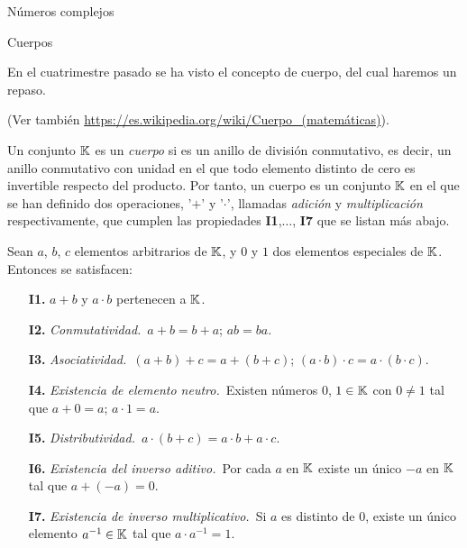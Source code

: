 \begin{chapter}{N\'umeros complejos}\label{chap-num-compl}

 \begin{section}{Cuerpos}\label{seccion-cuerpos}

  En el cuatrimestre pasado se ha visto el concepto de cuerpo, del cual haremos un repaso.

  (Ver también  \href{https://es.wikipedia.org/wiki/Cuerpo\_(matemáticas)}{https://es.wikipedia.org/wiki/Cuerpo\_(matemáticas)}).


  \begin{definicion}
      Un  conjunto $\mathbb K$ es un \textit{cuerpo} si es un anillo de división conmutativo, es decir, un anillo conmutativo con unidad en el que todo elemento distinto de cero es invertible respecto del producto. Por tanto,  un cuerpo es un conjunto $\mathbb K$ en el que se han definido dos operaciones, '$+$' y '$\cdot$', llamadas \textit{adición} y \textit{multiplicación} respectivamente, que cumplen las propiedades  \textbf{I1},$\ldots$, \textbf{I7} que se listan más abajo.

      Sean  $a$, $b$, $c$ elementos arbitrarios de $\mathbb K$, y $0$ y $1$ dos  elementos especiales de $\mathbb K$. Entonces se satisfacen:
      \begin{enumerate}
          \item[\textbf{I1.}] $a+b$ y $a\cdot b$ pertenecen a ${\mathbb K}$.
          \item[\textbf{I2.}] {\em Conmutatividad.}\, $a+b = b+a$; $ab=ba$.
          \item[\textbf{I3.}] {\em Asociatividad.}\, $(a+b)+c = a+(b+c)$;\; $(a\cdot b)\cdot c = a\cdot (b\cdot c)$.
          \item[\textbf{I4.}] {\em Existencia de elemento neutro.}\, Existen números $0$, $1 \in \mathbb K$ con $0\not=1$ tal que $a+0=a$; $a\cdot 1=a$.
          \item[\textbf{I5.}] {\em Distributividad.}\, $a\cdot (b+c)=a\cdot b+a\cdot c$.
          \item[\textbf{I6.}] {\em Existencia del inverso aditivo.}\, Por cada $a$ en ${\mathbb K}$ existe un único  $-a$ en ${\mathbb K}$ tal que $a+(-a)=0$.
          \item[\textbf{I7.}] {\em Existencia de inverso multiplicativo.}\, Si $a$ es distinto de $0$, existe un único elemento $a^{-1} \in \mathbb K$  tal que $a\cdot a^{-1}=1$.
      \end{enumerate}
  \end{definicion}


\end{section}
\end{chapter}
